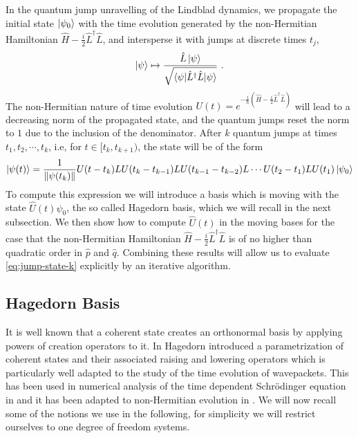 \documentclass[12pt]{iopart} %
\begin{document}
 In the quantum jump unravelling of the Lindblad dynamics, we propagate the initial state $\ket{\psi_0}$ with the time evolution generated by the non-Hermitian Hamiltonian 
$\hat H-\frac{i}{2}\hat L^{\dagger}\hat L$, and  intersperse it  with jumps at discrete times $t_j$, 
\begin{equation}
\ket{\psi}\mapsto\frac{\hat L\ket{\psi}}{\sqrt{\braket{\psi|\hat{L}^{\dagger}\hat{L}|\psi}}}\,\, . 
\end{equation}
The non-Hermitian nature of time evolution $U(t)=e^{-\frac{i}{\hbar}(\hat H-\frac{i}{2}\hat L^{\dagger}\hat L)}$ will lead to a decreasing norm of the propagated state, and the quantum jumps reset the norm to $1$ due to the inclusion of the denominator. 
After $k$ quantum jumps at times $t_1,t_2, \cdots, t_k$, i.e, for $t\in [t_k, t_{k+1})$,  the state will be of the form 
\begin{equation}\label{eq:jump-state-k}
\ket{\psi(t)}=\frac{1}{\lVert \psi(t_k)\lVert}U(t-t_k)LU(t_k-t_{k-1})LU(t_{k-1}-t_{k-2})L\cdots U(t_2-t_1)LU(t_1)\ket{\psi_0}
\end{equation}
To compute this expression we will introduce a basis which is moving with the state $\hat U(t)\psi_0$, the so called Hagedorn basis, which we will recall in the next subsection. We then show how to compute $\hat U(t)$ in the moving bases for the case that the non-Hermitian Hamiltonian $\hat H-\frac{i}{2}\hat L^{\dagger}\hat L$ is of no higher than quadratic order in $\hat p$ and $\hat q$. Combining these results will allow us to evaluate \eqref{eq:jump-state-k} explicitly by an iterative algorithm.  

\subsection{Hagedorn Basis}

It is well known that a coherent state creates an 
orthonormal basis by applying powers of creation operators to it. In \cite{hagedorn1998raising} Hagedorn introduced a parametrization of coherent states and their associated raising and lowering operators which is particularly well adapted to the study of the time evolution of wavepackets. This has been used in numerical analysis of the time dependent Schr{\"o}dinger equation in \cite{lubich08,lasser20} and it has been adapted to non-Hermitian evolution in \cite{lasser2018non}. We will now recall some of the notions we use in the following, for simplicity we will restrict ourselves to one degree of freedom systems. 
\end{document}
